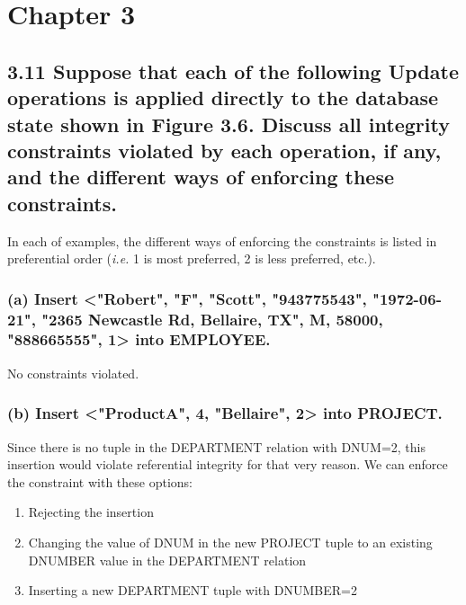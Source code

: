 \section*{Chapter 3}

\subsection*{3.11 Suppose that each of the following Update operations is applied directly to the database state shown in Figure 3.6. Discuss all integrity constraints violated by each operation, if any, and the different ways of enforcing these constraints.}

In each of examples, the different ways of enforcing the constraints is listed in preferential order (\textit{i.e.} 1 is most preferred, 2 is less preferred, etc.).

\subsubsection*{(a) Insert <"Robert", "F", "Scott", "943775543", "1972-06-21", "2365 Newcastle Rd, Bellaire, TX", M, 58000, "888665555", 1> into EMPLOYEE.}
No constraints violated.

\subsubsection*{(b) Insert <"ProductA", 4, "Bellaire", 2> into PROJECT.}
 Since there is no tuple in the DEPARTMENT relation with DNUM=2, this insertion would violate referential integrity for that very reason. We can enforce the constraint with these options:
\begin{enumerate}
\item Rejecting the insertion
\item Changing the value of DNUM in the new PROJECT tuple to an existing DNUMBER value in the DEPARTMENT relation
\item Inserting a new DEPARTMENT tuple with DNUMBER=2
\end{enumerate}

